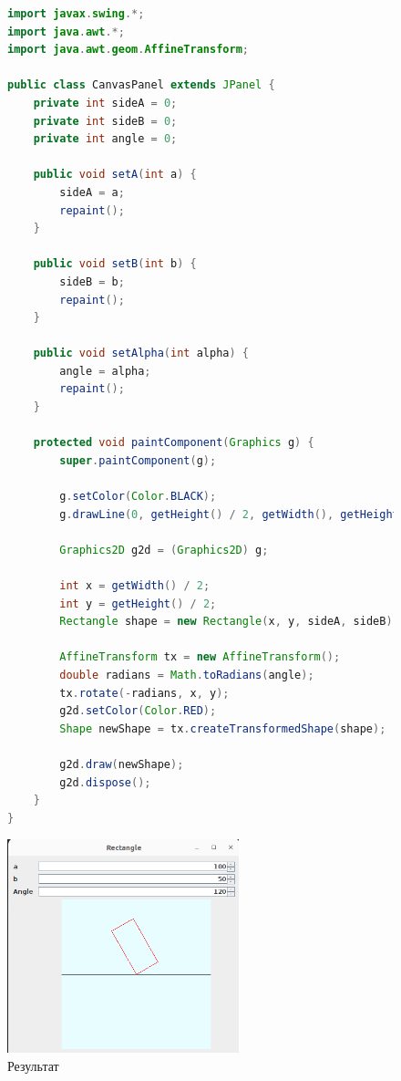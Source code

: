 \documentclass[a4paper, 14pt]{extarticle}
\begin{document}
\begin{figure}[!htb]
\begin{lstlisting}[language=Java,caption={Класс CanvasPanel},label={lst:canvaspanel}]
import javax.swing.*;
import java.awt.*;
import java.awt.geom.AffineTransform;

public class CanvasPanel extends JPanel {
    private int sideA = 0;
    private int sideB = 0;
    private int angle = 0;

    public void setA(int a) {
        sideA = a;
        repaint();
    }

    public void setB(int b) {
        sideB = b;
        repaint();
    }

    public void setAlpha(int alpha) {
        angle = alpha;
        repaint();
    }

    protected void paintComponent(Graphics g) {
        super.paintComponent(g);

        g.setColor(Color.BLACK);
        g.drawLine(0, getHeight() / 2, getWidth(), getHeight() / 2);

        Graphics2D g2d = (Graphics2D) g;

        int x = getWidth() / 2;
        int y = getHeight() / 2;
        Rectangle shape = new Rectangle(x, y, sideA, sideB);

        AffineTransform tx = new AffineTransform();
        double radians = Math.toRadians(angle);
        tx.rotate(-radians, x, y);
        g2d.setColor(Color.RED);
        Shape newShape = tx.createTransformedShape(shape);

        g2d.draw(newShape);
        g2d.dispose();
    }
}
\end{lstlisting}
\end{figure}

\begin{figure}[!htb]
	\centering
	\includegraphics[width=0.6\textwidth]{output1.png}
\caption{Результат}
\label{fig:output1}
\end{figure}
\end{document}
